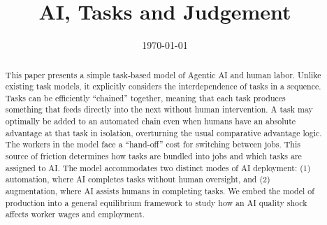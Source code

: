 \documentclass{article}
\theoremstyle{plain}
\theoremstyle{plain}
\begin{document}
\title{AI, Tasks and Judgement}
\author{}
\date{\today{}}



\newcommand{\T}[0]{\mathcal{T}}
\newcommand{\J}[0]{\mathcal{J}}
\newcommand{\machine}[1]{\langle #1 \rangle}
\newcommand{\human}[1]{( #1 )}
\newcommand{\cost}[1]{C\{ #1 \}}
\newcommand{\costdo}[1]{T_H\{ #1 \}}
\newcommand{\costmanage}[1]{T_M\{ #1 \}}
\newcommand{\timecost}[1]{t_{#1}}
\newcommand{\hccost}[1]{c_{#1}}
\newcommand{\labor}[1]{l_{#1}}
\newcommand{\handofftime}[1]{t^{s}_{#1}}
\newcommand{\humantime}[1]{t^{h}_{#1}}
\newcommand{\machinetime}[1]{t^{m}_{#1}}
\newcommand{\humanhc}[1]{c^{h}_{#1}}
\newcommand{\machinehc}[1]{c^{m}_{#1}}



\newcommand{\topic}[1]{\paragraph{#1}}

\renewcommand{\arraystretch}{1.75} %

\maketitle

\begin{abstract}
\noindent
This paper presents a simple task‐based model of Agentic AI and human labor.  
Unlike existing task models, it explicitly considers the interdependence of tasks in a sequence.  
Tasks can be efficiently ``chained'' together, meaning that each task produces something that feeds directly into the next without human intervention.  
A task may optimally be added to an automated chain even when humans have an absolute advantage at that task in isolation, overturning the usual comparative advantage logic.  
The workers in the model face a ``hand-off'' cost for switching between jobs.
This source of friction determines how tasks are bundled into jobs and which tasks are assigned to AI.
The model accommodates two distinct modes of AI deployment: (1) automation, where AI completes tasks without human oversight, and (2) augmentation, where AI assists humans in completing tasks.
We embed the model of production into a general equilibrium framework to study how an AI quality shock affects worker wages and employment. 
\end{abstract}
\end{document}
